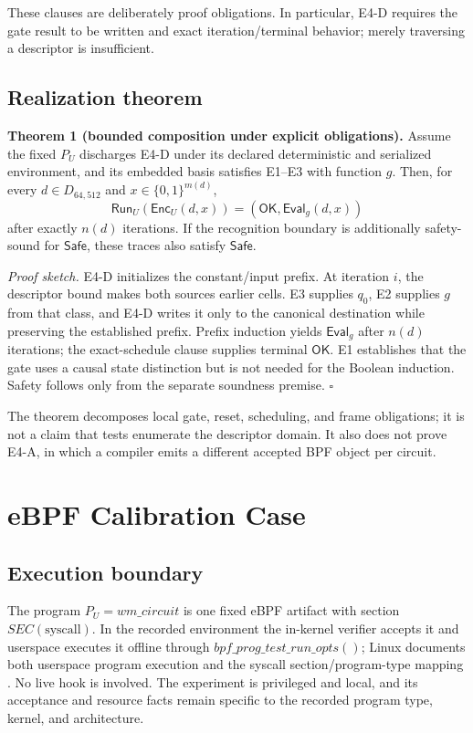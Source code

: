 \documentclass[conference]{IEEEtran}
\begin{document}
These clauses are deliberately proof obligations. In particular, E4-D requires the gate result to be written and exact iteration/terminal behavior; merely traversing a descriptor is insufficient.

\subsection{Realization theorem}

\medskip
\noindent\textbf{Theorem 1 (bounded composition under explicit obligations).}
Assume the fixed $P_U$ discharges E4-D under its declared deterministic and serialized environment, and its embedded basis satisfies E1--E3 with function $g$. Then, for every $d\in D_{64,512}$ and $x\in\{0,1\}^{m(d)}$,
\begin{equation}
\mathsf{Run}_U(\mathsf{Enc}_U(d,x))
=(\mathsf{OK},\mathsf{Eval}_g(d,x))
\end{equation}
after exactly $n(d)$ iterations. If the recognition boundary is additionally safety-sound for $\mathsf{Safe}$, these traces also satisfy $\mathsf{Safe}$.

\emph{Proof sketch.} E4-D initializes the constant/input prefix. At iteration $i$, the descriptor bound makes both sources earlier cells. E3 supplies $q_0$, E2 supplies $g$ from that class, and E4-D writes it only to the canonical destination while preserving the established prefix. Prefix induction yields $\mathsf{Eval}_g$ after $n(d)$ iterations; the exact-schedule clause supplies terminal $\mathsf{OK}$. E1 establishes that the gate uses a causal state distinction but is not needed for the Boolean induction. Safety follows only from the separate soundness premise. \hfill$\square$

The theorem decomposes local gate, reset, scheduling, and frame obligations; it is not a claim that tests enumerate the descriptor domain. It also does not prove E4-A, in which a compiler emits a different accepted BPF object per circuit.

\section{eBPF Calibration Case}

\subsection{Execution boundary}

The program $P_U=\mathit{wm\_circuit}$ is one fixed eBPF artifact with section $\mathit{SEC}(\text{syscall})$. In the recorded environment the in-kernel verifier accepts it and userspace executes it offline through $\mathit{bpf\_prog\_test\_run\_opts}()$; Linux documents both userspace program execution and the syscall section/program-type mapping \cite{ref6,ref7}. No live hook is involved. The experiment is privileged and local, and its acceptance and resource facts remain specific to the recorded program type, kernel, and architecture.
\end{document}
